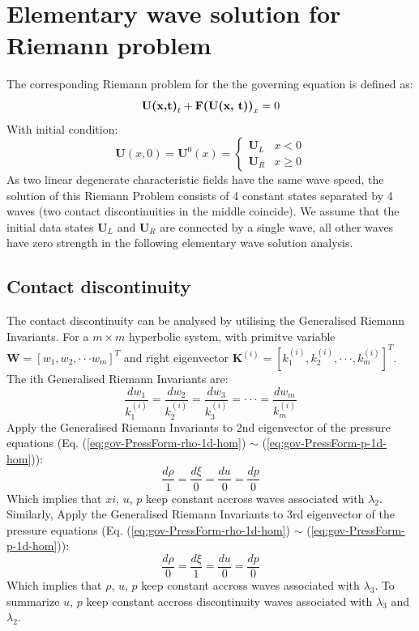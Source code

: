 \section{Elementary wave solution for Riemann problem}
The corresponding Riemann problem for the the governing equation is defined as: 
\begin{equation}
\textbf{U(x,t)}_t + \textbf{F(\textbf{U}(x, t))}_x = 0
\end{equation}
With initial condition: 
\begin{equation}
\textbf{U}(x, 0) = \textbf{U}^0(x) = \begin{cases} 
      \textbf{U}_L & x< 0\\
      \textbf{U}_R & x\geq 0
\end{cases}
\end{equation}
As two linear degenerate characteristic fields have the same wave speed, the solution of this Riemann Problem consists of 4 constant states separated by 4 waves (two contact discontinuities in the middle coincide). 
We assume that the initial data states $\textbf{U}_L$ and $\textbf{U}_R$ are connected by a single wave, all other waves have zero strength in the following elementary wave solution analysis.

\subsection{Contact discontinuity}
The contact discontinuity can be analysed by utilising the Generalised Riemann Invariants. For a $m \times m$ hyperbolic system, with primitve variable $\textbf{W} = \left[ w_1, w_2, \cdot \cdot \cdot w_m \right]^T$ and right eigenvector $\textbf{K}^{(i)}=[k^{(i)}_1,k^{(i)}_2, \cdot\cdot\cdot, k^{(i)}_m]^T$. The ith Generalised Riemann Invariants are: 
\begin{equation}
\frac{dw_1}{k^{(i)}_1}=\frac{dw_2}{k^{(i)}_2}=\frac{dw_3}{k^{(i)}_3}=\cdot\cdot\cdot=\frac{dw_m}{k^{(i)}_m}
\label{eq:Generalised-Riemann-Invariants}
\end{equation}
Apply the Generalised Riemann Invariants to 2nd eigenvector of the pressure equations (Eq. (\ref{eq:gov-PressForm-rho-1d-hom}) $\sim$ (\ref{eq:gov-PressForm-p-1d-hom})): 
\begin{equation}
\frac{d \rho}{1}=\frac{d \xi}{0} = \frac{d u}{0} = \frac{d p}{0}
\end{equation}
Which implies that $xi$, $u$, $p$ keep constant accross waves associated with $\lambda_2$. 
Similarly, Apply the Generalised Riemann Invariants to 3rd eigenvector of the pressure equations (Eq. (\ref{eq:gov-PressForm-rho-1d-hom}) $\sim$ (\ref{eq:gov-PressForm-p-1d-hom})):
\begin{equation}
\frac{d \rho}{0}=\frac{d \xi}{1} = \frac{d u}{0} = \frac{d p}{0}
\end{equation}
Which implies that $\rho$, $u$, $p$ keep constant accross waves associated with $\lambda_3$.
To summarize $u$, $p$ keep constant accross discontinuity waves associated with $\lambda_3$ and $\lambda_2$.

